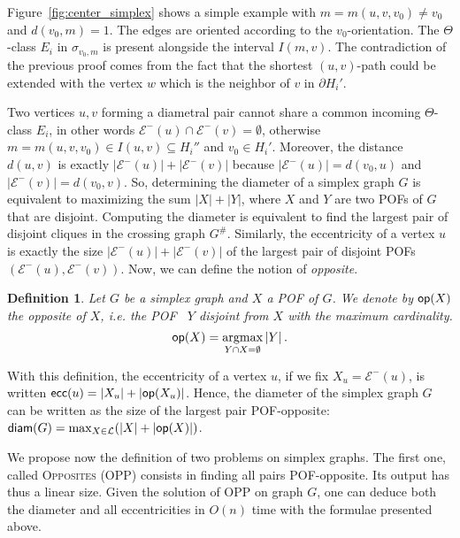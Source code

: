 \documentclass{article}
\DeclareMathOperator*{\argmax}{argmax}
\newtheorem{definition}{Definition}
\newcommand{\card}[1]{\left| #1 \right|}
\newcommand{\diam}{\mbox{\textsf{diam}}}
\newcommand{\ecc}{\mbox{\textsf{ecc}}}
\newcommand{\opp}{\mbox{\textsf{op}}}
\begin{document}
Figure~\ref{fig:center_simplex} shows a simple example with $m=m(u,v,v_0)\neq v_0$ and $d(v_0,m) = 1$. The edges are oriented according to the $v_0$-orientation. The $\Theta$-class $E_i$ in $\sigma_{v_0,m}$ is present alongside the interval $I(m,v)$. The contradiction of the previous proof comes from the fact that the shortest $(u,v)$-path could be extended with the vertex $w$ which is the neighbor of $v$ in $\partial H_i'$.

Two vertices $u,v$ forming a diametral pair cannot share a common incoming $\Theta$-class $E_i$, in other words $\mathcal{E}^-(u) \cap \mathcal{E}^-(v) = \emptyset$, otherwise $m = m(u,v,v_0) \in I(u,v) \subseteq H_i''$ and $v_0 \in H_i'$. Moreover, the distance $d(u,v)$ is exactly $\card{\mathcal{E}^-(u)} + \card{\mathcal{E}^-(v)}$ because $\card{\mathcal{E}^-(u)} = d(v_0,u)$ and $\card{\mathcal{E}^-(v)} = d(v_0,v)$. So, determining the diameter of a simplex graph $G$ is equivalent to maximizing the sum $\card{X} + \card{Y}$, where $X$ and $Y$ are two POFs of $G$ that are disjoint. Computing the diameter is equivalent to find the largest pair of disjoint cliques in the crossing graph $G^{\#}$. Similarly, the eccentricity of a vertex $u$ is exactly the size $\card{\mathcal{E}^-(u)} + \card{\mathcal{E}^-(v)}$ of the largest pair of disjoint POFs $(\mathcal{E}^-(u),\mathcal{E}^-(v))$.
Now, we can define the notion of \textit{opposite}.

\begin{definition}
Let $G$ be a simplex graph and $X$ a POF of $G$. We denote by $\opp(X)$ the \textit{opposite} of $X$, {\em i.e.} the POF~ $Y$ disjoint from $X$ with the maximum cardinality.
\[
\opp(X) = \argmax_{Y \cap X = \emptyset} \card{Y}.
\]
\label{def:opposite}
\end{definition}

With this definition, the eccentricity of a vertex $u$, if we fix $X_u = \mathcal{E}^-(u)$, is written $\ecc(u) = \card{X_u} + \card{\opp(X_u)}$. Hence, the diameter of the simplex graph $G$ can be written as the size of the largest pair POF-opposite: $\diam(G) = \max_{X\in \mathcal{L}}( \card{X} + \card{\opp(X)})$.

We propose now the definition of two problems on simplex graphs. The first one, called \textsc{Opposites} (OPP) consists in finding all pairs POF-opposite. Its output has thus a linear size. Given the solution of OPP on graph $G$, one can deduce both the diameter and all eccentricities in $O(n)$ time with the formulae presented above.
\end{document}

